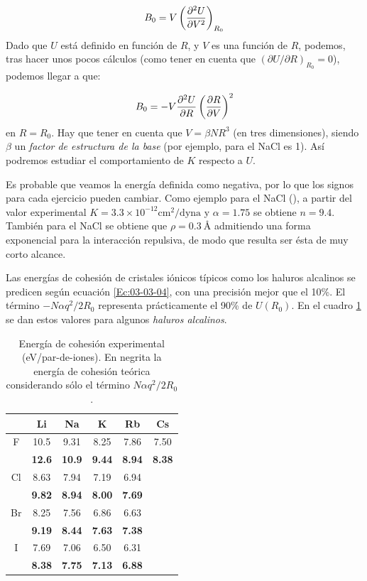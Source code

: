 \begin{equation}
	B_0 =  V \left( \frac{\partial ^2U}{\partial V^2} \right)_{R_0}
\end{equation}
Dado que $U$ está definido en función de $R$, y $V$ es una función de $R$, podemos, tras hacer unos pocos cálculos (como tener en cuenta que $(\partial U / \partial R)_{R_0}=0$), podemos llegar a que:

\begin{equation}
	B_0 = - V \frac{\partial ^2 U}{\partial R} \left( \frac{\partial R}{\partial V} \right)^2
\end{equation}
en $R=R_0$. Hay que tener en cuenta que $V=\beta N R^3$ (en tres dimensiones), siendo $\beta$ un \textit{factor de estructura de la base} (por ejemplo, para el NaCl es 1). Así podremos estudiar el comportamiento de $K$ respecto a $U$.

Es probable que veamos la energía definida como negativa, por lo que los signos para cada ejercicio pueden cambiar.  Como ejemplo para el NaCl (\fcc), a partir del valor experimental $K=3.3\times 10^{-12} \unit{\cm}^2 / \text{dyna}$ y $\alpha = 1.75$ se obtiene $n=9.4$. También para el NaCl se obtiene que $\rho=0.3 \ \unit{\angstrom}$ admitiendo una forma exponencial para la interacción repulsiva, de modo que resulta ser ésta de muy corto alcance.


Las energías de cohesión de cristales iónicos típicos como los haluros alcalinos se predicen según ecuación \ref{Ec:03-03-04}, con una precisión mejor que el 10\%. El término $-N\alpha q^2 / 2 R_0$ representa prácticamente el 90\% de $U(R_0)$. En el cuadro \ref{Tab:03-03} se dan estos valores para  algunos \textit{haluros alcalinos}.

\begin{table}[h!] \centering
    \begin{tabular}{c|ccccc}
        & Li & Na & K & Rb & Cs \\ \hline
        F & 10.5 & 9.31 & 8.25 & 7.86 & 7.50 \\
          & \textbf{12.6} & \textbf{10.9} & \textbf{9.44} & \textbf{8.94} & \textbf{8.38} \\ \hline
        Cl & 8.63  & 7.94 & 7.19 & 6.94 & \\
           & \textbf{9.82} & \textbf{8.94} & \textbf{8.00} & \textbf{7.69} & \\ \hline  
        Br & 8.25 & 7.56 & 6.86 & 6.63 & \\
           & \textbf{9.19} & \textbf{8.44} & \textbf{7.63} & \textbf{7.38} & \\ \hline
        I & 7.69 & 7.06 & 6.50 & 6.31 & \\
        & \textbf{8.38} & \textbf{7.75} & \textbf{7.13} & \textbf{6.88} &  
    \end{tabular}
    \caption{Energía de cohesión experimental (eV/par-de-iones). En negrita la energía de cohesión teórica considerando sólo el término $N\alpha q^2 / 2 R_0$.}
    \label{Tab:03-03}
\end{table}


